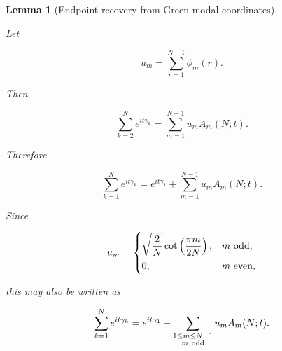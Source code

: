 \documentclass[11pt]{amsart}
\numberwithin{equation}{section}
\theoremstyle{plain}
\newtheorem{lemma}[theorem]{Lemma}
\theoremstyle{definition}
\theoremstyle{remark}
\begin{document}
\begin{lemma}[Endpoint recovery from Green-modal coordinates]
\label{cor:endpoint_projection}

Let

\begin{equation}
u_m=\sum_{r=1}^{N-1}\phi_m(r).
\end{equation}

Then

\begin{equation}
\sum_{k=2}^{N}e^{it\gamma_k}
=
\sum_{m=1}^{N-1}
u_mA_m(N;t).
\label{eq:endpoint_without_first_modal_recovery}
\end{equation}

Therefore

\begin{equation}
\sum_{k=1}^{N}e^{it\gamma_k}
=
e^{it\gamma_1}
+
\sum_{m=1}^{N-1}u_mA_m(N;t).
\label{eq:ordinary_exponential_sum_modal_projection}
\end{equation}

Since

\begin{equation}
u_m
=
\begin{cases}
\displaystyle
\sqrt{\dfrac2N}
\cot\left(\dfrac{\pi m}{2N}\right),
&
m\ {\rm odd},
\\[6pt]
0,
&
m\ {\rm even},
\end{cases}
\end{equation}

this may also be written as

\begin{equation}
\sum_{k=1}^{N}e^{it\gamma_k}
=
e^{it\gamma_1}
+
\sum_{\substack{1\le m\le N-1\\m\ {\rm odd}}}
u_mA_m(N;t).
\label{eq:ordinary_exponential_sum_odd_modal_projection}
\end{equation}

\end{lemma}
\end{document}
